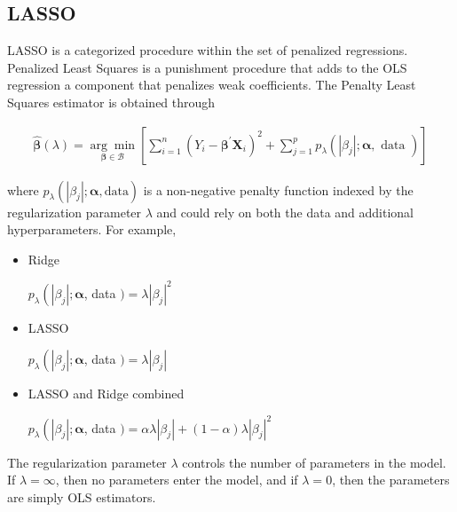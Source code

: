 \subsection{LASSO}\label{apen:lasso}

LASSO is a categorized procedure within the set of penalized regressions. Penalized Least Squares is a punishment procedure that adds to the OLS regression a component that penalizes weak coefficients. The Penalty Least Squares estimator is obtained through

\begin{align*}
	\widehat{\boldsymbol{\beta}}(\lambda)=\underset{\boldsymbol{\beta} \in \mathcal{B}}{\arg \min }\left[\sum_{i=1}^n\left(Y_i-\boldsymbol{\beta}^{\prime} \boldsymbol{X}_i\right)^2+\sum_{j=1}^p p_\lambda\left(\left|\beta_j\right| ; \boldsymbol{\alpha}, \text { data }\right)\right]
\end{align*}

where $p_\lambda\left(\left|\beta_j\right| ; \boldsymbol{\alpha}, \text{data}\right)$ is a non-negative penalty function indexed by the regularization parameter $\lambda$ and could rely on both the data and additional hyperparameters. For example,

\begin{itemize}
	\item Ridge
	
	$p_\lambda\left(\left|\beta_j\right| ; \boldsymbol{\alpha}\right.$, data $)=\lambda\left|\beta_j\right|^2$
	\item LASSO
	
	$p_\lambda\left(\left|\beta_j\right| ; \boldsymbol{\alpha}\right.$, data $)=\lambda\left|\beta_j\right|$
	\item LASSO and Ridge combined
	
	$p_\lambda\left(\left|\beta_j\right| ; \boldsymbol{\alpha}\right.$, data $)=\alpha \lambda\left|\beta_j\right|+(1-\alpha) \lambda\left|\beta_j\right|^2$
\end{itemize}

The regularization parameter $\lambda$ controls the number of parameters in the model. If $\lambda = \infty$, then no parameters enter the model, and if $\lambda = 0$, then the parameters are simply OLS estimators.



%



